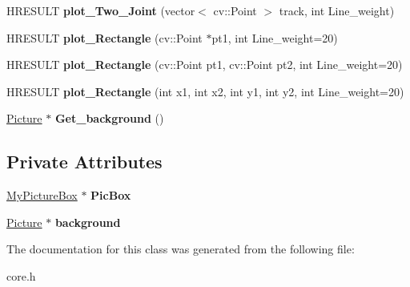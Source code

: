 \begin{DoxyCompactItemize}
\item 
\mbox{\label{class_mywebcam_1_1view_a85f21c5781667c1d240fd1e5edf5aa32}} 
H\+R\+E\+S\+U\+LT {\bfseries plot\+\_\+\+Two\+\_\+\+Joint} (vector$<$ cv\+::\+Point $>$ track, int Line\+\_\+weight)
\item 
\mbox{\label{class_mywebcam_1_1view_a999ba23719c9f947e2b1c854c2deb2bc}} 
H\+R\+E\+S\+U\+LT {\bfseries plot\+\_\+\+Rectangle} (cv\+::\+Point $\ast$pt1, int Line\+\_\+weight=20)
\item 
\mbox{\label{class_mywebcam_1_1view_ac4b2bc8a754cf40834961f19f666f8ce}} 
H\+R\+E\+S\+U\+LT {\bfseries plot\+\_\+\+Rectangle} (cv\+::\+Point pt1, cv\+::\+Point pt2, int Line\+\_\+weight=20)
\item 
\mbox{\label{class_mywebcam_1_1view_ad067d5a52f9cba73f42742252a1611c9}} 
H\+R\+E\+S\+U\+LT {\bfseries plot\+\_\+\+Rectangle} (int x1, int x2, int y1, int y2, int Line\+\_\+weight=20)
\item 
\mbox{\label{class_mywebcam_1_1view_ae3ea77733096c69577e0df69fe6fdbb9}} 
\hyperlink{class_mywebcam_1_1_picture}{Picture} $\ast$ {\bfseries Get\+\_\+background} ()
\end{DoxyCompactItemize}
\subsection*{Private Attributes}
\begin{DoxyCompactItemize}
\item 
\mbox{\label{class_mywebcam_1_1view_ae0bbc78b05ad82cf23a60d797fea13a9}} 
\hyperlink{class_mywebcam_1_1_my_picture_box}{My\+Picture\+Box} $\ast$ {\bfseries Pic\+Box}
\item 
\mbox{\label{class_mywebcam_1_1view_a830680b8289b4fad9c206b0b18c57358}} 
\hyperlink{class_mywebcam_1_1_picture}{Picture} $\ast$ {\bfseries background}
\end{DoxyCompactItemize}


The documentation for this class was generated from the following file\+:\begin{DoxyCompactItemize}
\item 
core.\+h\end{DoxyCompactItemize}
